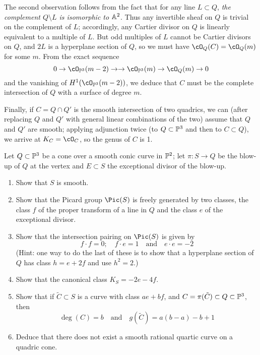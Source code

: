 The second observation follows from the fact that for any line $L \subset Q$, \emph{the complement $Q \setminus L$ is isomorphic to $\AA^2$}. Thus any invertible sheaf on $Q$ is trivial on the complement of $L$; accordingly, any Cartier divisor on $Q$ is linearly equivalent to a multiple of $L$. But odd multiples of $L$ cannot be Cartier divisors on $Q$, and $2L$ is a hyperplane section of $Q$, so we must have $\cO_Q(C) = \cO_Q(m)$ for some $m$. From the exact sequence
$$
0 \to \cO_{\PP^3}(m-2) \to \to \cO_{\PP^3}(m) \to \cO_{Q}(m)  \to 0
$$
and the vanishing of $H^1(\cO_{\PP^3}(m-2))$, we deduce that $C$ must be the complete intersection of $Q$ with a surface of degree $m$.

Finally, if $C = Q \cap Q'$ is the smooth intersection of two quadrics, we can (after replacing $Q$ and $Q'$ with general linear combinations of the two) assume that $Q$ and $Q'$ are smooth; applying adjunction twice (to $Q \subset \PP^3$ and then to $C \subset Q$), we arrive at $K_C = \cO_C$, so the genus of $C$ is 1.

\begin{exercise}\label{F2}
Let $Q \subset \PP^3$ be a cone over a smooth conic curve in $\PP^2$; let $\pi : S \to Q$ be the blow-up of $Q$ at the vertex and $E \subset S$ the exceptional divisor of the blow-up.
\begin{enumerate}
\item Show that $S$ is smooth.
\item Show that the Picard group $\Pic(S)$ is freely generated by two classes, the class $f$ of the proper transform of a line in $Q$ and the class $e$ of the exceptional divisor.
\item Show that the intersection pairing on $\Pic(S)$ is given by
$$
f \cdot f = 0; \quad f \cdot e = 1 \quad \text{and} \quad e \cdot e = -2
$$
(Hint: one way to do the last of these is to show that a hyperplane section of $Q$ has class $h = e + 2f$ and use $h^2 = 2$.)
\item Show that the canonical class $K_S = -2e-4f$.
\item Show that if $\tilde C \subset S$ is a curve with class $ae + bf$, and
$C = \pi(\tilde C) \subset Q \subset \PP^3$, then
$$
\deg(C) = b \quad \text{and} \quad g(\tilde C) = a(b-a) -b +1
$$
\item Deduce that there does not exist a smooth rational quartic curve on a quadric cone.
\end{enumerate}
\end{exercise}

